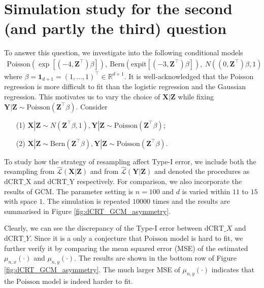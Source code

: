 \documentclass{article}
\begin{document}
\section{Simulation study for the second (and partly the third) question}

To answer this question, we investigate into the following conditional models 
\begin{align*}
    \text{Poisson}(\exp[(-4,\bm Z^\top) \beta]),\ \text{Bern}(\text{expit}[(-3, \bm Z^\top)\beta]),\ N((0,\bm Z^\top)\beta,1)
\end{align*}
where $ \beta=\bm 1_{d+1}=(1,\ldots,1)^\top\in\mathbb{R}^{d+1}$. It is well-acknowledged that the Poisson regression is more 
difficult to fit than the logistic regression and the Gaussian regression. This motivates us to vary the choice of $\bm X|\bm Z$ 
while fixing $\bm Y|\bm Z\sim \text{Poisson}(\bm Z^\top\beta)$. Consider 
\begin{enumerate}
    \item[(1)]$\bm X|\bm Z\sim N(\bm Z^\top\beta,1),\bm Y|\bm Z\sim \text{Poisson}(\bm Z^\top\beta)$;
    \item[(2)]$\bm X|\bm Z\sim \text{Bern}(\bm Z^\top\beta),\bm Y|\bm Z\sim \text{Poisson}(\bm Z^\top\beta)$.
\end{enumerate}
To study how the strategy of resampling affect Type-I error, we include both the resampling from $\hat{\mathcal{L}}(\bm X|\bm Z)$ and 
from $\hat{\mathcal{L}}(\bm Y|\bm Z)$ and denoted the procedures as $\mathrm{dCRT}\_\text{X}$ and $\mathrm{dCRT}\_\text{Y}$ respectively. 
For comparison, we also incorporate the results of $\mathrm{GCM}$. The parameter setting is $n=100$ and $d$ is varied within $11$ to $15$ 
with space $1$. The simulation is repeated $10000$ times and the results are summarised in Figure \ref{fig:dCRT_GCM_asymmetry}. 

Clearly, we can see the discrepancy of the Type-I error between $\mathrm{dCRT}\_X$ and $\mathrm{dCRT}\_Y$. Since it is a only a conjecture 
that $\mathrm{Poisson}$ model is hard to fit, we further verify it by comparing the mean squared error (MSE) of the estimated $\mu_{n,x}(\cdot)$ 
and $\mu_{n,y}(\cdot)$. The results are shown in the bottom row of Figure \ref{fig:dCRT_GCM_asymmetry}. The much larger MSE of $\mu_{n,y}(\cdot)$
indicates that the $\mathrm{Poisson}$ model is indeed harder to fit. 
\end{document}
